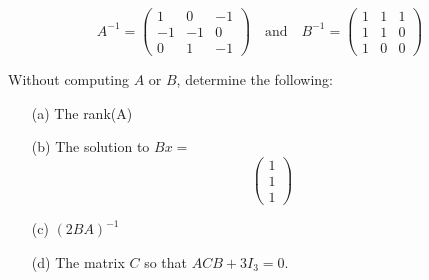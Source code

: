 \documentclass{report}
\begin{document}
\[A^{-1} = \begin{pmatrix}
1 & 0 & -1 \\
-1 & -1 & 0 \\
0 & 1 & -1
\end{pmatrix}
\quad\text{and}\quad
B^{-1} = \begin{pmatrix}
1 & 1 & 1 \\
1 & 1 & 0 \\
1 & 0 & 0
\end{pmatrix}
\]

Without computing $A$ or $B$, determine the following:


\begin{enumerate}
\item[(a)] The rank(A)
    \item[(b)] The solution to $Bx = $
\[
\begin{pmatrix}
1 \\
1 \\
1
\end{pmatrix}
\]
    \item[(c)] $(2BA)^{-1}$
    \item[(d)] The matrix $C$ so that $ACB+3I_3=0$.
    
\end{enumerate}


\sol
\end{document}
